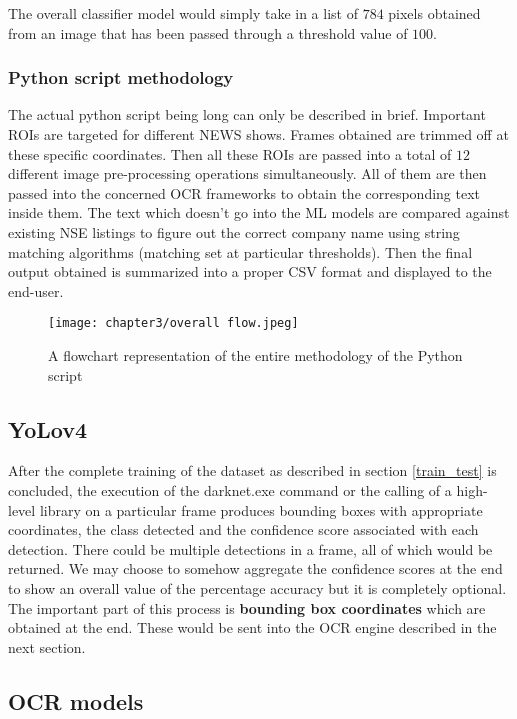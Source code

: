 The overall classifier model would simply take in a list of $784$ pixels obtained from an image that has been passed through a threshold value of $100$.

\subsubsection{Python script methodology}
The actual python script being long can only be described in brief. Important ROIs are targeted for different NEWS shows. Frames obtained are trimmed off at these specific coordinates. Then all these ROIs are passed into a total of $12$ different image pre-processing operations simultaneously. All of them are then passed into the concerned OCR frameworks to obtain the corresponding text inside them. The text which doesn’t go into the ML models are compared against existing NSE listings to figure out the correct company name using string matching algorithms (matching set at particular thresholds). Then the final output obtained is summarized into a proper CSV format and displayed to the end-user.

\begin{figure}[h]
  \centering
  \texttt{[image: chapter3/overall flow.jpeg]}
  \caption{A flowchart representation of the entire methodology of the Python script}
  \label{fig:process_flow_python}
\end{figure}

\subsection{YoLov4} \label{yv4}

After the complete training of the dataset as described in section \ref{train_test} is concluded, the execution of the {\selectfont darknet.exe} command or the calling of a high-level library on a particular frame produces bounding boxes with appropriate coordinates, the class detected and the confidence score associated with each detection. There could be multiple detections in a frame, all of which would be returned. We may choose to somehow aggregate the confidence scores at the end to show an overall value of the percentage accuracy but it is completely optional. The important part of this process is \textbf{bounding box coordinates} which are obtained at the end. These would be sent into the OCR engine described in the next section.

\subsection{OCR models}

